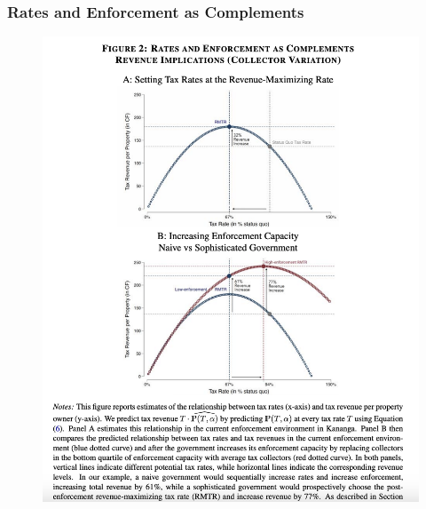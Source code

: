 \documentclass{beamer}
\begin{document}
\begin{frame}
\frametitle{Rates and Enforcement as Complements}
\begin{figure}
    \centering
    \includegraphics[height=0.9\textheight,width=\textwidth]{Paper Presentations/The State Capacity Ceiling on Tax Rates/F2.png}
\end{figure}
\end{frame}
\end{document}
